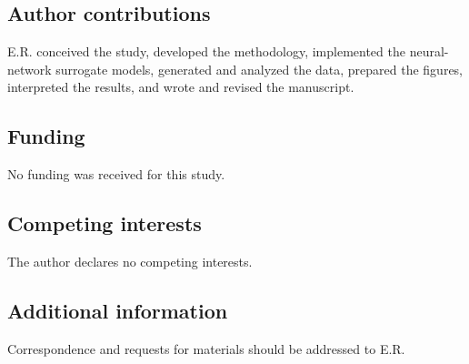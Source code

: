 \documentclass[preprint,12pt]{elsarticle}
\begin{document}
\subsection*{Author contributions}

E.R. conceived the study, developed the methodology, implemented the neural-network surrogate models, generated and analyzed the data, prepared the figures, interpreted the results, and wrote and revised the manuscript.

\subsection*{Funding}

No funding was received for this study.

\subsection*{Competing interests}

The author declares no competing interests.

\subsection*{Additional information}

Correspondence and requests for materials should be addressed to E.R.





\end{document}
